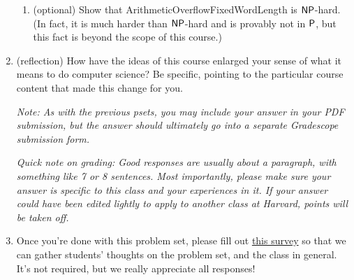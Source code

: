 \documentclass[11pt]{article}
\begin{document}
\begin{enumerate}
\begin{enumerate}
    \item (optional) Show that ArithmeticOverflowFixedWordLength is $\mathsf{NP}$-hard.  (In fact, it is much harder than $\mathsf{NP}$-hard and is provably not in $\mathsf{P}$, but this fact is beyond the scope of this course.)  
  \end{enumerate}


\item (reflection)  How have the ideas of this course enlarged your sense of what it means to do computer science?  Be specific, pointing to the particular course content that made this change for you.

 \textit{Note: As with the previous psets, you may include your answer in your PDF submission, but the answer should ultimately go into a separate Gradescope submission form.}

 \textit{Quick note on grading: Good responses are usually about a paragraph, with something like 7 or 8 sentences. Most importantly, please make sure your answer is specific to this class and your experiences in it. If your answer could have been edited lightly to apply to another class at Harvard, points will be taken off.}

 \item Once you're done with this problem set, please fill out \href{https://forms.gle/nMnuwZxw9nYNT7AE7}{this survey} so that we can gather students' thoughts on the problem set, and the class in general. It's not required, but we really appreciate all responses!
 
\end{enumerate}
\end{document}
